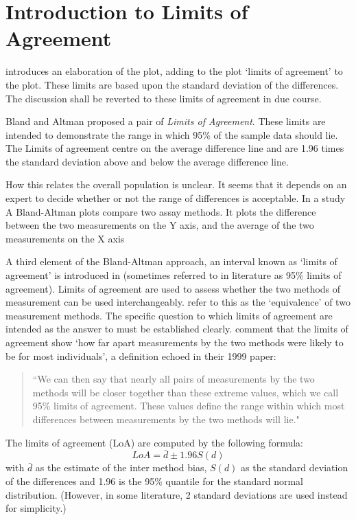 \documentclass[Main.tex]{subfiles}
\begin{document}
\section{Introduction to Limits of Agreement}

	\citet{BA86} introduces an elaboration of the plot, adding to the
	plot `limits of agreement' to the plot. These limits are based
	upon the standard deviation of the differences. The discussion
	shall be reverted to these limits of agreement in due course.
	
	
	Bland and Altman proposed a pair of \textit{Limits of Agreement}. These
	limits are intended to demonstrate the range in which 95\% of the
	sample data should lie. The Limits of agreement centre on the
	average difference line and are 1.96 times the standard deviation
	above and below the average difference line.



	How this relates the overall population is unclear. It seems that
	it depends on an expert to decide whether or not the range of
	differences is acceptable. In a study A Bland-Altman plots compare
	two assay methods. It plots the difference between the two
	measurements on the Y axis, and the average of the two
	measurements on the X axis
	


A third element of the Bland-Altman approach, an interval known as `limits of agreement' is introduced in \citet*{BA86}
(sometimes referred to in literature as 95\% limits of agreement). Limits of agreement are used to assess whether the two methods of
measurement can be used interchangeably. \citet{BA86} refer to this as the `equivalence' of two measurement methods. The specific question to which limits of agreement are intended as the answer to must be established clearly. \citet*{BA95} comment that the limits of agreement show `how far apart measurements by the two methods were likely to be for
most individuals', a definition echoed in their 1999 paper:

\begin{quote}``We can then say that nearly all pairs
	of measurements by the two methods will be closer together than
	these extreme values, which we call 95\% limits of agreement.
	These values define the range within which most differences
	between measurements by the two methods will lie."
\end{quote}


	
	The limits of agreement (LoA) are computed by the following
	formula:
	\begin{equation}
	LoA = \bar{d} \pm 1.96 S(d)
	\end{equation}
	with $\bar{d}$ as the estimate of the inter method bias, $S(d)$ as
	the standard deviation of the differences and 1.96 is the 95\%
	quantile for the standard normal distribution. (However, in some
	literature, 2 standard deviations are used instead for
	simplicity.) 
	
\end{document}
